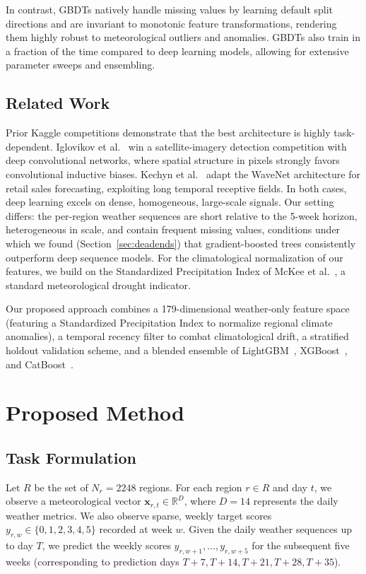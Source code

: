 \documentclass[conference]{IEEEtran}
\begin{document}
In contrast, GBDTs natively handle missing values by learning default split directions and are invariant to monotonic feature transformations, rendering them highly robust to meteorological outliers and anomalies. GBDTs also train in a fraction of the time compared to deep learning models, allowing for extensive parameter sweeps and ensembling.

\subsection{Related Work}
Prior Kaggle competitions demonstrate that the best architecture is highly task-dependent. Iglovikov et al.~\cite{iglovikov2017satellite} win a satellite-imagery detection competition with deep convolutional networks, where spatial structure in pixels strongly favors convolutional inductive biases. Kechyn et al.~\cite{kechyn2018sales} adapt the WaveNet architecture for retail sales forecasting, exploiting long temporal receptive fields. In both cases, deep learning excels on dense, homogeneous, large-scale signals. Our setting differs: the per-region weather sequences are short relative to the 5-week horizon, heterogeneous in scale, and contain frequent missing values, conditions under which we found (Section~\ref{sec:deadends}) that gradient-boosted trees consistently outperform deep sequence models. For the climatological normalization of our features, we build on the Standardized Precipitation Index of McKee et al.~\cite{mckee1993relationship}, a standard meteorological drought indicator.

Our proposed approach combines a 179-dimensional weather-only feature space (featuring a Standardized Precipitation Index to normalize regional climate anomalies), a temporal recency filter to combat climatological drift, a stratified holdout validation scheme, and a blended ensemble of LightGBM~\cite{ke2017lightgbm}, XGBoost~\cite{chen2016xgboost}, and CatBoost~\cite{prokhorenkova2018catboost}.


\section{Proposed Method}

\subsection{Task Formulation}
Let $R$ be the set of $N_r = 2248$ regions. For each region $r \in R$ and day $t$, we observe a meteorological vector $\mathbf{x}_{r, t} \in \mathbb{R}^{D}$, where $D=14$ represents the daily weather metrics. We also observe sparse, weekly target scores $y_{r, w} \in \{0, 1, 2, 3, 4, 5\}$ recorded at week $w$. Given the daily weather sequences up to day $T$, we predict the weekly scores $y_{r, w+1}, \dots, y_{r, w+5}$ for the subsequent five weeks (corresponding to prediction days $T+7, T+14, T+21, T+28, T+35$).
\end{document}
